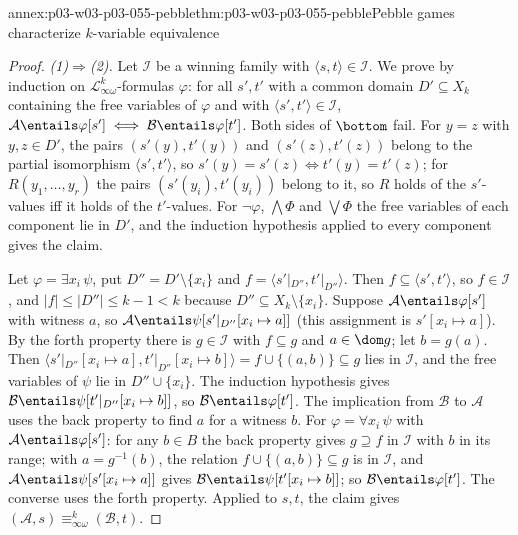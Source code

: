 \begin{annexitem}{annex:p03-w03-p03-055-pebble}{thm:p03-w03-p03-055-pebble}{Pebble games characterize \(k\)-variable equivalence}
\begin{proof}
\emph{(1)\(\Rightarrow\)(2).} Let \(\mathcal I\) be a winning family with
\(\langle s,t\rangle\in\mathcal I\). We prove by induction on
\(\mathcal L^k_{\infty\omega}\)-formulas \(\varphi\): for all
\(s',t'\) with a common domain \(D'\subseteq X_k\) containing the free
variables of \(\varphi\) and with \(\langle s',t'\rangle\in\mathcal I\),
\(\mathcal A\entails\varphi[s']\iff\mathcal B\entails\varphi[t']\).
Both sides of \(\bottom\) fail. For \(y=z\) with \(y,z\in D'\), the
pairs \((s'(y),t'(y))\) and \((s'(z),t'(z))\) belong to the partial
isomorphism \(\langle s',t'\rangle\), so \(s'(y)=s'(z)\iff t'(y)=t'(z)\);
for \(R(y_1,\ldots,y_r)\) the pairs \((s'(y_i),t'(y_i))\) belong to it, so
\(R\) holds of the \(s'\)-values iff it holds of the \(t'\)-values. For \(\neg\varphi\), \(\bigwedge\Phi\) and \(\bigvee\Phi\) the
free variables of each component lie in \(D'\), and the induction
hypothesis applied to every component gives the claim.

Let \(\varphi=\exists x_i\,\psi\), put \(D''=D'\setminus\{x_i\}\) and
\(f=\langle s'|_{D''},t'|_{D''}\rangle\). Then
\(f\subseteq\langle s',t'\rangle\), so \(f\in\mathcal I\), and
\(|f|\le|D''|\le k-1<k\) because \(D''\subseteq X_k\setminus\{x_i\}\).
Suppose \(\mathcal A\entails\varphi[s']\) with witness \(a\), so
\(\mathcal A\entails\psi[s'|_{D''}[x_i\mapsto a]]\) (this assignment is
\(s'[x_i\mapsto a]\)). By the forth property there is \(g\in\mathcal I\)
with \(f\subseteq g\) and \(a\in\dom g\); let \(b=g(a)\). Then
\(\langle s'|_{D''}[x_i\mapsto a],t'|_{D''}[x_i\mapsto b]\rangle=
f\cup\{(a,b)\}\subseteq g\) lies in \(\mathcal I\), and the free variables
of \(\psi\) lie in \(D''\cup\{x_i\}\). The induction hypothesis gives
\(\mathcal B\entails\psi[t'|_{D''}[x_i\mapsto b]]\), so
\(\mathcal B\entails\varphi[t']\). The implication from \(\mathcal B\) to
\(\mathcal A\) uses the back property to find \(a\) for a witness \(b\).
For \(\varphi=\forall x_i\,\psi\) with \(\mathcal A\entails\varphi[s']\):
for any \(b\in B\) the back property gives \(g\supseteq f\) in
\(\mathcal I\) with \(b\) in its range; with \(a=g^{-1}(b)\), the relation
\(f\cup\{(a,b)\}\subseteq g\) is in \(\mathcal I\), and
\(\mathcal A\entails\psi[s'[x_i\mapsto a]]\) gives
\(\mathcal B\entails\psi[t'[x_i\mapsto b]]\); so
\(\mathcal B\entails\varphi[t']\). The converse uses the forth property.
Applied to \(s,t\), the claim gives
\((\mathcal A,s)\equiv^k_{\infty\omega}(\mathcal B,t)\).


\end{proof}
\end{annexitem}
